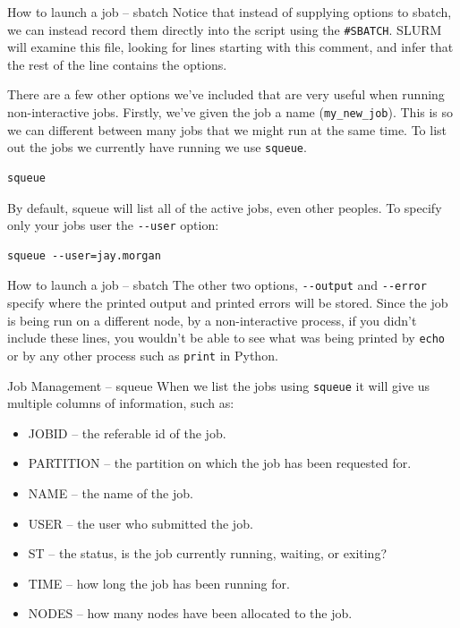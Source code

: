 \documentclass[10pt]{beamer}
\begin{document}
\begin{frame}[label={sec:org4bc1957},fragile]{How to launch a job -- sbatch}
 Notice that instead of supplying options to sbatch, we can instead record them
directly into the script using the \texttt{\#SBATCH}. SLURM will examine this file,
looking for lines starting with this comment, and infer that the rest of the
line contains the options.

There are a few other options we've included that are very useful when running
non-interactive jobs. Firstly, we've given the job a name (\texttt{my\_new\_job}). This is
so we can different between many jobs that we might run at the same time. To
list out the jobs we currently have running we use \texttt{squeue}.

\begin{verbatim}
squeue
\end{verbatim}

By default, squeue will list all of the active jobs, even other peoples. To
specify only your jobs user the \texttt{-{}-user} option:

\begin{verbatim}
squeue --user=jay.morgan
\end{verbatim}
\end{frame}

\begin{frame}[label={sec:org346045f},fragile]{How to launch a job -- sbatch}
 The other two options, \texttt{-{}-output} and \texttt{-{}-error} specify where the printed output and
printed errors will be stored. Since the job is being run on a different node,
by a non-interactive process, if you didn't include these lines, you wouldn't be
able to see what was being printed by \texttt{echo} or by any other process such as \texttt{print}
in Python.
\end{frame}

\begin{frame}[label={sec:orgc34d4d1},fragile]{Job Management -- squeue}
 When we list the jobs using \texttt{squeue} it will give us multiple columns of
information, such as:

\begin{itemize}
\item JOBID -- the referable id of the job.
\item PARTITION -- the partition on which the job has been requested for.
\item NAME -- the name of the job.
\item USER -- the user who submitted the job.
\item ST -- the status, is the job currently running, waiting, or exiting?
\item TIME -- how long the job has been running for.
\item NODES -- how many nodes have been allocated to the job.
\end{itemize}
\end{frame}
\end{document}
